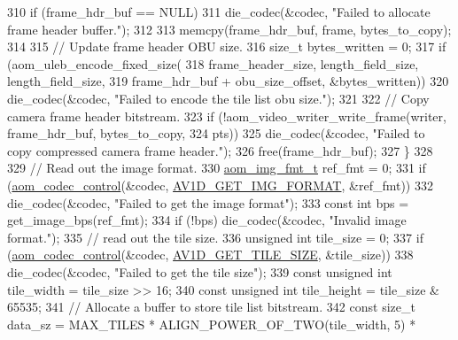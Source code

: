 \begin{DoxyCodeInclude}
{{{{{{310     \textcolor{keywordflow}{if} (frame\_hdr\_buf == NULL)
311       die\_codec(&codec, \textcolor{stringliteral}{"Failed to allocate frame header buffer."});
312 
313     memcpy(frame\_hdr\_buf, frame, bytes\_to\_copy);
314 
315     \textcolor{comment}{// Update frame header OBU size.}
316     \textcolor{keywordtype}{size\_t} bytes\_written = 0;
317     \textcolor{keywordflow}{if} (aom\_uleb\_encode\_fixed\_size(
318             frame\_header\_size, length\_field\_size, length\_field\_size,
319             frame\_hdr\_buf + obu\_size\_offset, &bytes\_written))
320       die\_codec(&codec, \textcolor{stringliteral}{"Failed to encode the tile list obu size."});
321 
322     \textcolor{comment}{// Copy camera frame header bitstream.}
323     \textcolor{keywordflow}{if} (!aom\_video\_writer\_write\_frame(writer, frame\_hdr\_buf, bytes\_to\_copy,
324                                       pts))
325       die\_codec(&codec, \textcolor{stringliteral}{"Failed to copy compressed camera frame header."});
326     free(frame\_hdr\_buf);
327   \}
328 
329   \textcolor{comment}{// Read out the image format.}
330   \hyperlink{aom__image_8h_ab71efff8c7f49380fad23b93bc2e9bfc}{aom\_img\_fmt\_t} ref\_fmt = 0;
331   \textcolor{keywordflow}{if} (\hyperlink{group__codec_ga6da974f4eeaba1fa74106b28d0fe6ac5}{aom\_codec\_control}(&codec, \hyperlink{group__aom__decoder_gga3865fd4b3192489baa9a5c3632ebe97bacd7229e5fb766670fe995739931c2ee3}{AV1D\_GET\_IMG\_FORMAT}, &ref\_fmt))
332     die\_codec(&codec, \textcolor{stringliteral}{"Failed to get the image format"});
333   \textcolor{keyword}{const} \textcolor{keywordtype}{int} bps = get\_image\_bps(ref\_fmt);
334   \textcolor{keywordflow}{if} (!bps) die\_codec(&codec, \textcolor{stringliteral}{"Invalid image format."});
335   \textcolor{comment}{// read out the tile size.}
336   \textcolor{keywordtype}{unsigned} \textcolor{keywordtype}{int} tile\_size = 0;
337   \textcolor{keywordflow}{if} (\hyperlink{group__codec_ga6da974f4eeaba1fa74106b28d0fe6ac5}{aom\_codec\_control}(&codec, \hyperlink{group__aom__decoder_gga3865fd4b3192489baa9a5c3632ebe97ba4d9799d9e520785870b8d1f73a19c3c4}{AV1D\_GET\_TILE\_SIZE}, &tile\_size))
338     die\_codec(&codec, \textcolor{stringliteral}{"Failed to get the tile size"});
339   \textcolor{keyword}{const} \textcolor{keywordtype}{unsigned} \textcolor{keywordtype}{int} tile\_width = tile\_size >> 16;
340   \textcolor{keyword}{const} \textcolor{keywordtype}{unsigned} \textcolor{keywordtype}{int} tile\_height = tile\_size & 65535;
341   \textcolor{comment}{// Allocate a buffer to store tile list bitstream.}
342   \textcolor{keyword}{const} \textcolor{keywordtype}{size\_t} data\_sz = MAX\_TILES * ALIGN\_POWER\_OF\_TWO(tile\_width, 5) *
}}}}}}
\end{DoxyCodeInclude}
